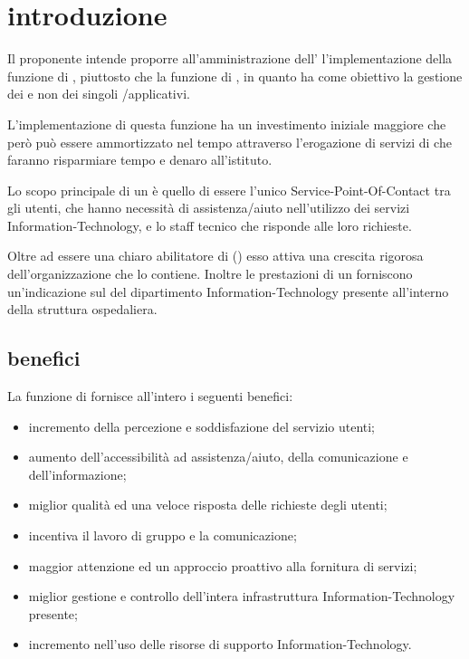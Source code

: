 %
%
\section[Introduzione]{introduzione}
\label{sd-introduction}
Il proponente intende proporre all'amministrazione dell'\entity{} l'implementazione della funzione di , piuttosto che la funzione di , in quanto ha come obiettivo la gestione dei  e non dei singoli /applicativi.

L'implementazione di questa funzione ha un investimento iniziale maggiore che però può essere ammortizzato nel tempo attraverso l'erogazione di servizi di  che faranno risparmiare tempo e denaro all'istituto.

Lo scopo principale di un  è quello di essere l'unico \ac{Service-Point-Of-Contact} tra gli utenti, che hanno necessità di assistenza/aiuto nell'utilizzo dei servizi \acs{Information-Technology}, e lo staff tecnico che risponde alle loro richieste.

Oltre ad essere una chiaro abilitatore di  () esso attiva una crescita rigorosa dell'organizzazione che lo contiene. Inoltre le prestazioni di un  forniscono un'indicazione sul  del dipartimento \acs{Information-Technology} presente all'interno della struttura ospedaliera.

\subsection[Benefici]{benefici}
\label{sd-introduction-benefit}
La funzione di  fornisce all'intero \entity{} i seguenti benefici:

\begin{itemize}
\item{incremento della percezione e soddisfazione del servizio utenti;}
\item{aumento dell'accessibilità ad assistenza/aiuto, della comunicazione e dell'informazione;}
\item{miglior qualità ed una veloce risposta delle richieste degli utenti;}
\item{incentiva il lavoro di gruppo e la comunicazione;}
\item{maggior attenzione ed un approccio proattivo alla fornitura di servizi;}
\item{miglior gestione e controllo dell'intera infrastruttura \acs{Information-Technology} presente;}
\item{incremento nell'uso delle risorse di supporto \acs{Information-Technology}.}
\end{itemize}

